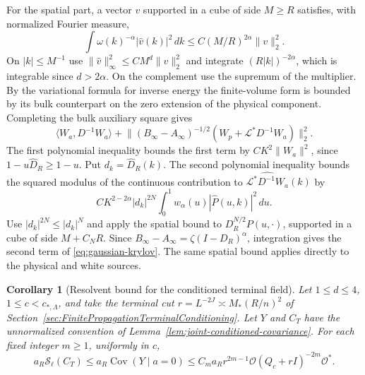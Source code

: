 \documentclass[11pt]{article}
\newtheorem{corollary}[theorem]{Corollary}
\theoremstyle{definition}
\begin{document}
For the spatial part, a vector \(v\) supported in a cube of side
\(M\ge R\) satisfies, with normalized Fourier measure,
\begin{equation}
 \int \omega(k)^{-\alpha}|\widehat v(k)|^2\,dk
 \le C(M/R)^{2\alpha}\|v\|_2^2 .
\end{equation}
On \(|k|\le M^{-1}\) use \(\|\widehat v\|_\infty^2\le CM^d\|v\|_2^2\)
and integrate \((R|k|)^{-2\alpha}\), which is integrable since
\(d>2\alpha\). On the complement use the supremum of the multiplier.
By the variational formula for inverse energy the finite-volume form
is bounded by its bulk counterpart on the zero extension of the
physical component. Completing the bulk auxiliary square gives
\begin{equation}
 \langle W_a,D^{-1}W_a\rangle+
 \big\|(B_\infty-A_\infty)^{-1/2}
        (W_p+\mathcal L^*D^{-1}W_a)\big\|_2^2 .
\end{equation}
The first polynomial inequality bounds the first term by
\(CK^2\|W_a\|^2\), since \(1-u\widehat D_R\ge1-u\).
Put \(d_k=\widehat D_R(k)\). The second polynomial inequality bounds
the squared modulus of the continuous contribution to
\(\widehat{\mathcal L^*D^{-1}W_a}(k)\) by
\begin{equation}
 CK^{2-2\alpha}|d_k|^{2N}
     \int_0^1 w_\alpha(u)|\widehat P(u,k)|^2\,du .
\end{equation}
Use \(|d_k|^{2N}\le |d_k|^N\) and apply the spatial bound to
\(D_R^{N/2}P(u,\cdot)\), supported in a cube of side \(M+C_NR\).
Since \(B_\infty-A_\infty=\zeta(I-D_R)^\alpha\), integration gives
the second term of \eqref{eq:gaussian-krylov}. The same spatial bound
applies directly to the physical and white sources.

\begin{corollary}[Resolvent bound for the conditioned terminal field]
\label{cor:terminal-resolvent-majorant}
Let \(1\le d\le4\), \(1\le c<c_{*,\Lambda}\), and take the terminal
cut \(r=L^{-2J}\asymp M_*(R/n)^2\) of
Section~\ref{sec:FinitePropagationTerminalConditioning}.
Let \(Y\) and \(C_T\) have the unnormalized convention of
Lemma~\ref{lem:joint-conditioned-covariance}. For each fixed integer
\(m\ge1\), uniformly in \(c\),
\begin{equation}
 a_R\mathcal S_\ell(C_T)\le a_R\operatorname{Cov}(Y\mid a=0)
 \le C_m a_R r^{2m-1}\mathcal O (Q_c+rI)^{-2m}\mathcal O^* .
\end{equation}
\end{corollary}
\end{document}
